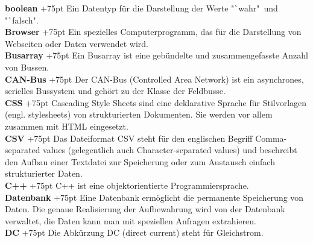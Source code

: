 \documentclass[fontsize = 12pt, paper = a4]{scrreprt}
\begin{document}
\textbf{boolean}
\hangindent+75pt  
\hspace*{7.5mm}
Ein Datentyp für die Darstellung der Werte "`wahr"\ und "`falsch".\\

\textbf{Browser}
\hangindent+75pt 
\hspace*{6.5mm}
Ein spezielles Computerprogramm, das für die Darstellung von Webseiten oder Daten verwendet wird.\\

\textbf{Busarray}
\hangindent+75pt 
\hspace*{5.5mm} 
Ein Busarray ist eine gebündelte und zusammengefasste Anzahl von Bussen.\\

\textbf{CAN-Bus}
\hangindent+75pt 
\hspace*{3mm} 
Der CAN-Bus (Controlled Area Network) ist ein asynchrones, serielles Bussystem und gehört zu der Klasse der Feldbusse.\\

\textbf{CSS}
\hangindent+75pt 
\hspace*{15mm}
Cascading Style Sheets sind eine deklarative Sprache für Stilvorlagen (engl. stylesheets) von strukturierten Dokumenten. Sie werden vor allem zusammen mit HTML eingesetzt.\\


\textbf{CSV}
\hangindent+75pt 
\hspace*{13.5mm}
Das Dateiformat CSV steht für den englischen Begriff Comma-separated values (gelegentlich auch Character-separated values) und beschreibt den Aufbau einer Textdatei zur Speicherung oder zum Austausch einfach strukturierter Daten.\\

\textbf{C++}
\hangindent+75pt 
\hspace*{13.5mm}
C++ ist eine objektorientierte Programmiersprache.\\

\textbf{Datenbank}
\hangindent+75pt 
\hspace*{1.25mm}
Eine Datenbank ermöglicht die permanente Speicherung von Daten. Die genaue Realisierung der Aufbewahrung wird von der Datenbank verwaltet, die Daten kann man mit speziellen Anfragen extrahieren.\\

\textbf{DC}
\hangindent+75pt 
\hspace*{16.5mm}
Die Abkürzung DC (direct current) steht für Gleichstrom.\\
\end{document}
